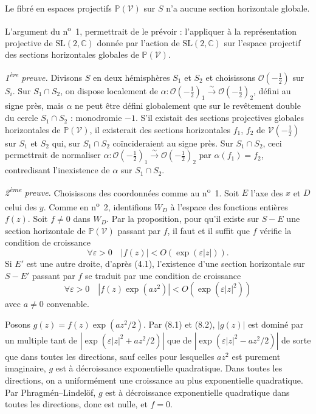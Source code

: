 \documentclass[12pt,a4paper]{article}
\theoremstyle{plain}
\theoremstyle{definition}
\theoremstyle{remark}
\begin{document}
Le fibré en espaces projectifs $\mathbb{P}(\mathscr{V})$ sur $S$ n'a aucune section horizontale globale.

L'argument du n\textsuperscript{o}~1, permettrait de le prévoir : l'appliquer à la représentation projective de $\mathrm{SL}(2, \mathbb{C})$ donnée par l'action de $\mathrm{SL}(2, \mathbb{C})$ sur l'espace projectif des sections horizontales globales de $\mathbb{P}(\mathscr{V})$.

\medskip
\noindent\textit{1\textsuperscript{ère} preuve.} Divisons $S$ en deux hémisphères $S_1$ et $S_2$ et choisissons $\mathcal{O}(-\frac{1}{2})$ sur $S_i$. Sur $S_1 \cap S_2$, on dispose localement de $\alpha \colon \mathcal{O}(-\frac{1}{2})_1 \xrightarrow{\sim} \mathcal{O}(-\frac{1}{2})_2$, défini au signe près, mais $\alpha$ ne peut être défini globalement que sur le revêtement double du cercle $S_1 \cap S_2$ : monodromie $-1$. S'il existait des sections projectives globales horizontales de $\mathbb{P}(\mathscr{V})$, il existerait des sections horizontales $f_1$, $f_2$ de $\mathscr{V}(-\frac{1}{2})$ sur $S_1$ et $S_2$ qui, sur $S_1 \cap S_2$ coïncideraient au signe près. Sur $S_1 \cap S_2$, ceci permettrait de normaliser $\alpha \colon \mathcal{O}(-\frac{1}{2})_1 \xrightarrow{\sim} \mathcal{O}(-\frac{1}{2})_2$ par $\alpha(f_1) = f_2$, contredisant l'inexistence de $\alpha$ sur $S_1 \cap S_2$.

\medskip
\noindent\textit{2\textsuperscript{ème} preuve.} Choisissons des coordonnées comme au n\textsuperscript{o}~1. Soit $E$ l'axe des $x$ et $D$ celui des $y$. Comme en n\textsuperscript{o}~2, identifions $W_D$ à l'espace des fonctions entières $f(z)$. Soit $f \neq 0$ dans $W_D$. Par la proposition, pour qu'il existe sur $S - E$ une section horizontale de $\mathbb{P}(\mathscr{V})$ passant par $f$, il faut et il suffit que $f$ vérifie la condition de croissance
\begin{equation}\label{eq:8.1}
\forall \varepsilon > 0 \quad |f(z)| < O(\exp(\varepsilon|z|)).\tag{8.1}
\end{equation}
Si $E'$ est une autre droite, d'après (4.1), l'existence d'une section horizontale sur $S - E'$ passant par $f$ se traduit par une condition de croissance
\begin{equation}\label{eq:8.2}
\forall \varepsilon > 0 \quad |f(z)\exp(az^2)| < O(\exp(\varepsilon|z|^2))\tag{8.2}
\end{equation}
avec $a \neq 0$ convenable.

Posons $g(z) = f(z)\exp(az^2/2)$. Par (8.1) et (8.2), $|g(z)|$ est dominé par un multiple tant de $|\exp(\varepsilon|z|^2 + az^2/2)|$ que de $|\exp(\varepsilon|z|^2 - az^2/2)|$ de sorte que dans toutes les directions, sauf celles pour lesquelles $az^2$ est purement imaginaire, $g$ est à décroissance exponentielle quadratique. Dans toutes les directions, on a uniformément une croissance au plus exponentielle quadratique. Par Phragmén--Lindelöf, $g$ est à décroissance exponentielle quadratique dans toutes les directions, donc est nulle, et $f = 0$.
\end{document}

